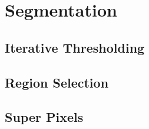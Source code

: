\section{Segmentation}

\subsection{Iterative Thresholding}
\subsection{Region Selection}
\subsection{Super Pixels}
